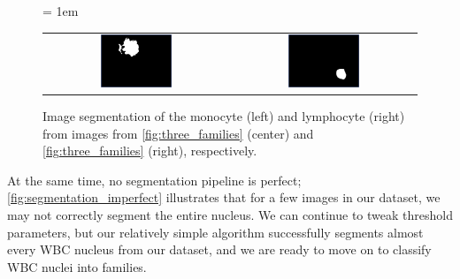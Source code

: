 \begin{figure}[h]
\centering
\tabcolsep = 1em
\mySfFamily
\begin{tabular}{c c}
\includegraphics[width = 0.4\textwidth]{../images/monocyte_binarized.png} & \includegraphics[width = 0.4\textwidth]{../images/lymphocyte_binarized.png}
\end{tabular}
\caption{Image segmentation of the monocyte (left) and lymphocyte (right) from images from \autoref{fig:three_families} (center) and \autoref{fig:three_families} (right), respectively.}
\label{fig:segmentation}
\end{figure}

At the same time, no segmentation pipeline is perfect; \autoref{fig:segmentation_imperfect} illustrates that for a few images in our dataset, we may not correctly segment the entire nucleus. We can continue to tweak threshold parameters, but our relatively simple algorithm successfully segments almost every WBC nucleus from our dataset, and we are ready to move on to classify WBC nuclei into families.\\

